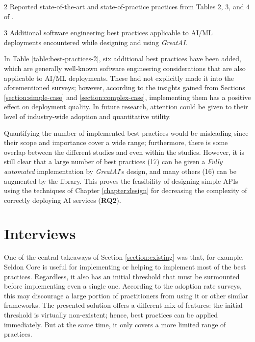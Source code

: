 \begin{table}
\begin{threeparttable}
{\begin{tabular}{p{7cm}@{\hskip 0.5cm}l@{\hskip 0cm}c}
\end{tabular}}
\begin{tablenotes}
    \item[2] Reported state-of-the-art and state-of-practice practices from Tables 2, 3, and 4 of \cite{john2020architecting}.
    \item[3] Additional software engineering best practices applicable to AI/ML deployments encountered while designing and using \textit{GreatAI}.
\end{tablenotes}
\end{threeparttable}
\end{table}

\FloatBarrier

In Table \ref{table:best-practices-2}, six additional best practices have been added, which are generally well-known software engineering considerations that are also applicable to AI/ML deployments. These had not explicitly made it into the aforementioned surveys; however, according to the insights gained from Sections \ref{section:simple-case} and \ref{section:complex-case}, implementing them has a positive effect on deployment quality. In future research, attention could be given to their level of industry-wide adoption and quantitative utility.

Quantifying the number of implemented best practices would be misleading since their scope and importance cover a wide range; furthermore, there is some overlap between the different studies and even within the studies. However, it is still clear that a large number of best practices (17) can be given a \textit{Fully automated} implementation by \textit{GreatAI}'s design, and many others (16) can be augmented by the library. This proves the feasibility of designing simple APIs using the techniques of Chapter \ref{chapter:design} for decreasing the complexity of correctly deploying AI services (\textbf{RQ2}).

\section{Interviews} \label{section:interviews}

One of the central takeaways of Section \ref{section:existing} was that, for example, Seldon Core is useful for implementing or helping to implement most of the best practices. Regardless, it also has an initial threshold that must be surmounted before implementing even a single one. According to the adoption rate surveys, this may discourage a large portion of practitioners from using it or other similar frameworks. The presented solution offers a different mix of features: the initial threshold is virtually non-existent; hence, best practices can be applied immediately. But at the same time, it only covers a more limited range of practices. 


